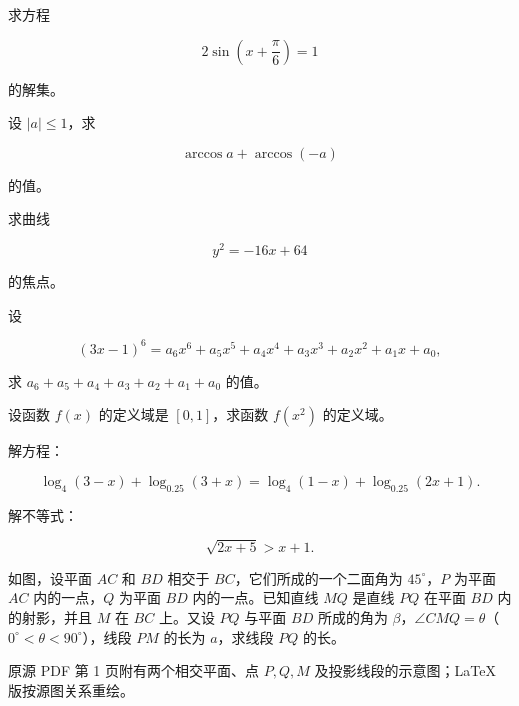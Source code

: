 \begin{question}
求方程

\nopagebreak[4]
\[
2\sin\left(x+\frac\pi6\right)=1
\]

的解集。

\end{question}
\begin{question}
设 $|a|\le1$，求

\nopagebreak[4]
\[
\arccos a+\arccos(-a)
\]

的值。

\end{question}
\begin{question}
求曲线

\nopagebreak[4]
\[
y^2=-16x+64
\]

的焦点。

\end{question}
\begin{question}
设

\nopagebreak[4]
\[
(3x-1)^6=a_6x^6+a_5x^5+a_4x^4+a_3x^3+a_2x^2+a_1x+a_0,
\]

求 $a_6+a_5+a_4+a_3+a_2+a_1+a_0$ 的值。

\end{question}
\begin{question}
设函数 $f(x)$ 的定义域是 $[0,1]$，求函数 $f(x^2)$ 的定义域。

\end{question}
\begin{question}
解方程：

\nopagebreak[4]
\[
\log_4(3-x)+\log_{0.25}(3+x)
=\log_4(1-x)+\log_{0.25}(2x+1).
\]

\end{question}
\begin{question}
解不等式：

\nopagebreak[4]
\[
\sqrt{2x+5}>x+1.
\]

\Needspace{0.4\textheight}
\end{question}
\begin{question}
如图，设平面 $AC$ 和 $BD$ 相交于 $BC$，它们所成的一个二面角为 $45^\circ$，$P$ 为平面 $AC$ 内的一点，$Q$ 为平面 $BD$ 内的一点。已知直线 $MQ$ 是直线 $PQ$ 在平面 $BD$ 内的射影，并且 $M$ 在 $BC$ 上。又设 $PQ$ 与平面 $BD$ 所成的角为 $\beta$，$\angle CMQ=\theta$（$0^\circ<\theta<90^\circ$），线段 $PM$ 的长为 $a$，求线段 $PQ$ 的长。

\begin{gktip}
原源 PDF 第 1 页附有两个相交平面、点 $P,Q,M$ 及投影线段的示意图；LaTeX 版按源图关系重绘。
\end{gktip}
\nopagebreak[4]
\begin{center}\end{center}
\nopagebreak[4]
\end{question}
